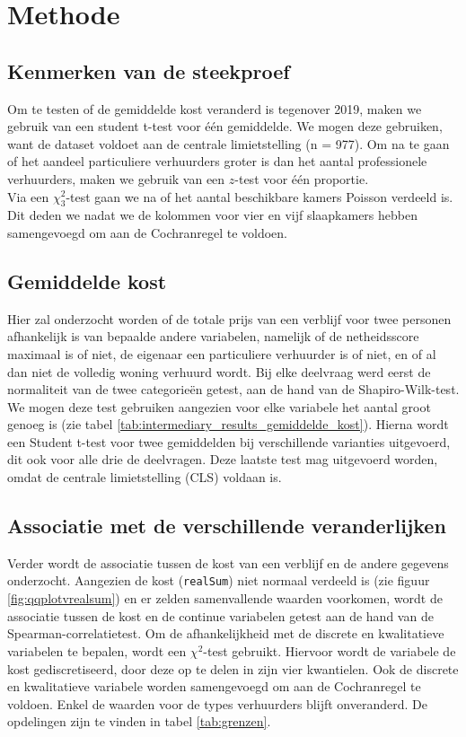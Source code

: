 \documentclass[a4paper]{kulakarticle}
\begin{document}
	\section{Methode}
	
	\subsection{Kenmerken van de steekproef}
	Om te testen of de gemiddelde kost veranderd is tegenover 2019, maken we gebruik van een student t-test voor één gemiddelde. We mogen deze gebruiken, want de dataset voldoet aan de centrale limietstelling (n = 977). Om na te gaan of het aandeel particuliere verhuurders groter is dan het aantal professionele verhuurders, maken we gebruik van een $z$-test voor één proportie.\\
	Via een $\chi^2_{3}$-test gaan we na of het aantal beschikbare kamers Poisson verdeeld is. Dit deden we nadat we de kolommen voor vier en vijf slaapkamers hebben samengevoegd om aan de Cochranregel te voldoen.
	
	\subsection{Gemiddelde kost}
	
	Hier zal onderzocht worden of de totale prijs van een verblijf voor twee personen afhankelijk is van bepaalde andere variabelen, namelijk of de netheidsscore maximaal is of niet, de eigenaar een particuliere verhuurder is of niet, en of al dan niet de volledig woning verhuurd wordt.
	Bij elke deelvraag werd eerst de normaliteit van de twee categorieën getest, aan de hand van de Shapiro-Wilk-test. We mogen deze test gebruiken aangezien voor elke variabele het aantal groot genoeg is (zie tabel \ref{tab:intermediary_results_gemiddelde_kost}). Hierna wordt een Student t-test voor twee gemiddelden bij verschillende varianties uitgevoerd, dit ook voor alle drie de deelvragen. Deze laatste test mag uitgevoerd worden, omdat de centrale limietstelling (CLS) voldaan is.

	\subsection{Associatie met de verschillende veranderlijken}
	
	Verder wordt de associatie tussen de kost van een verblijf en de andere gegevens onderzocht. Aangezien de kost (\verb|realSum|) niet normaal verdeeld is (zie figuur \ref{fig:qqplotvrealsum}) en er zelden samenvallende waarden voorkomen, wordt de associatie tussen de kost en de continue variabelen getest aan de hand van de Spearman-correlatietest. Om de afhankelijkheid met de discrete en kwalitatieve variabelen te bepalen, wordt een $\chi ^2$-test gebruikt. Hiervoor wordt de variabele de kost gediscretiseerd, door deze op te delen in zijn vier kwantielen. Ook de discrete en kwalitatieve variabele worden samengevoegd om aan de Cochranregel te voldoen. Enkel de waarden voor de types verhuurders blijft onveranderd. De opdelingen zijn te vinden in tabel \ref{tab:grenzen}. \\\\
	
\end{document}
